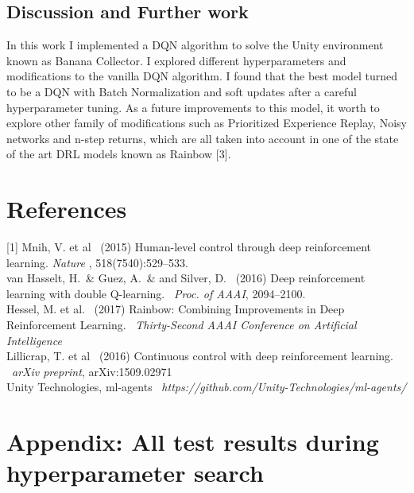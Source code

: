 \documentclass{article}
\begin{document}
\subsection{Discussion and Further work}

In this work I implemented a DQN algorithm to solve the Unity environment known as Banana Collector. I explored different hyperparameters and modifications to the vanilla DQN algorithm. I found that the best model turned to be a DQN with Batch Normalization and soft updates after a careful hyperparameter tuning. As a future improvements to this model, it worth to explore other family of modifications such as Prioritized Experience Replay, Noisy networks and n-step returns, which are all taken into account in one of the state of the art DRL models known as Rainbow [3].


\section*{References}

\small

[1] Mnih, V. et al \ (2015) Human-level control through
deep reinforcement learning. \textit{ Nature }, 518(7540):529–533. \\

\noindent
[2] van Hasselt, H.\ \& Guez, A.\ \& and Silver, D. \ (2016) Deep reinforcement learning with double Q-learning.\ \textit{ Proc. of AAAI}, 2094–2100.\\

\noindent
[3] Hessel, M. et al. \ (2017) Rainbow: Combining Improvements in Deep Reinforcement Learning. \ \textit{Thirty-Second AAAI Conference on Artificial Intelligence}\\

\noindent
[4] Lillicrap, T. et al \ (2016) Continuous control with deep reinforcement learning. \ \textit{arXiv preprint}, arXiv:1509.02971 \\

\noindent
[5] Unity Technologies, ml-agents \ \textit{https://github.com/Unity-Technologies/ml-agents/} \\


\section*{Appendix: All test results during hyperparameter search}
\end{document}
